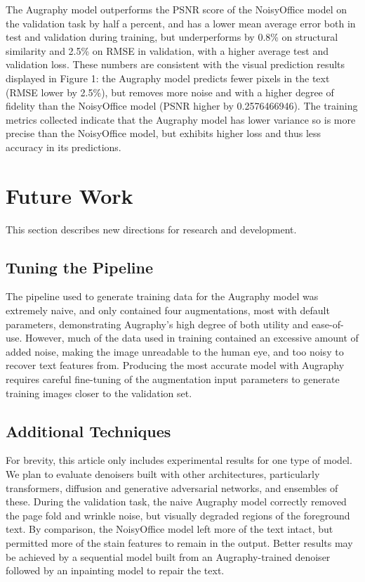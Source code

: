 \documentclass[runningheads]{llncs}
\begin{document}
The Augraphy model outperforms the PSNR score of the NoisyOffice model on the validation task by half a percent, and has a lower mean average error both in test and validation during training, but underperforms by 0.8\% on structural similarity and 2.5\% on RMSE in validation, with a higher average test and validation loss. These numbers are consistent with the visual prediction results displayed in Figure 1: the Augraphy model predicts fewer pixels in the text (RMSE lower by 2.5\%), but removes more noise and with a higher degree of fidelity than the NoisyOffice model (PSNR higher by 0.2576466946). The training metrics collected indicate that the Augraphy model has lower variance so is more precise than the NoisyOffice model, but exhibits higher loss and thus less accuracy in its predictions.

\section{Future Work}
This section describes new directions for research and development.

\subsection{Tuning the Pipeline}
The pipeline used to generate training data for the Augraphy model was extremely naive, and only contained four augmentations, most with default parameters, demonstrating Augraphy's high degree of both utility and ease-of-use. However, much of the data used in training contained an excessive amount of added noise, making the image unreadable to the human eye, and too noisy to recover text features from. Producing the most accurate model with Augraphy requires careful fine-tuning of the augmentation input parameters to generate training images closer to the validation set.

\subsection{Additional Techniques}
For brevity, this article only includes experimental results for one type of model. We plan to evaluate denoisers built with other architectures, particularly transformers, diffusion and generative adversarial networks, and ensembles of these. During the validation task, the naive Augraphy model correctly removed the page fold and wrinkle noise, but visually degraded regions of the foreground text. By comparison, the NoisyOffice model left more of the text intact, but permitted more of the stain features to remain in the output. Better results may be achieved by a sequential model built from an Augraphy-trained denoiser followed by an inpainting model to repair the text.\\
\end{document}
